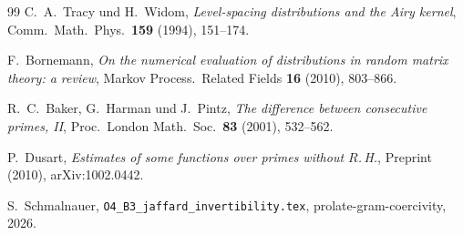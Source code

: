 \documentclass[12pt,a4paper]{amsart}
\theoremstyle{definition}
\begin{document}
\begin{thebibliography}{99}
C.~A.~Tracy und H.~Widom,
\textit{Level-spacing distributions and the Airy kernel},
Comm.\ Math.\ Phys.\ \textbf{159} (1994), 151--174.

F.~Bornemann,
\textit{On the numerical evaluation of distributions in random matrix theory:
a review},
Markov Process.\ Related Fields \textbf{16} (2010), 803--866.

R.~C.~Baker, G.~Harman und J.~Pintz,
\textit{The difference between consecutive primes, II},
Proc.\ London Math.\ Soc.\ \textbf{83} (2001), 532--562.

P.~Dusart,
\textit{Estimates of some functions over primes without $R$.\,H.},
Preprint (2010), arXiv:1002.0442.

S.~Schmalnauer,
\texttt{O4\_B3\_jaffard\_invertibility.tex},
\textsf{prolate-gram-coercivity}, 2026.
\end{thebibliography}
\end{document}
